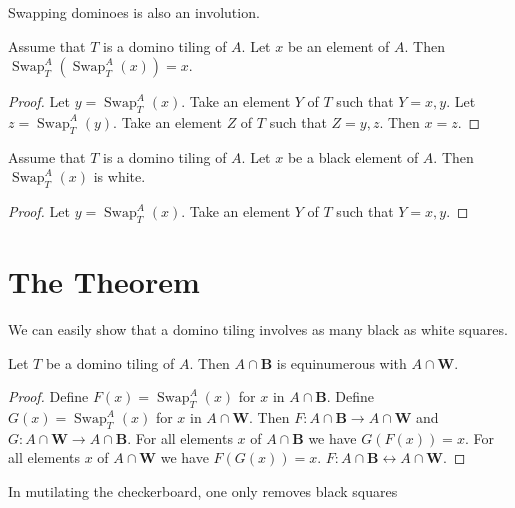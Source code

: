 \documentclass{article}
\newcommand{\Black}{\mathbf{B}}
\newcommand{\White}{\mathbf{W}}
\newcommand{\Sw}[3]{\operatorname{Swap}_{#1}^{#2}(#3)}
\begin{document}
Swapping dominoes is also an involution.

\begin{forthel}
    \begin{lemma}
        Assume that $T$ is a domino tiling of $A$. Let $x$ be an element of $A$.
        Then $\Sw{T}{A}{\Sw{T}{A}{x}} = x$.
    \end{lemma}
    \begin{proof}
        Let $y = \Sw{T}{A}{x}$.
        Take an element $Y$ of $T$ such that $Y = {x,y}$.
        Let $z = \Sw{T}{A}{y}$.
        Take an element $Z$ of $T$ such that $Z = {y,z}$.
        Then $x = z$.
    \end{proof}

    \begin{lemma}
        Assume that $T$ is a domino tiling of $A$.
        Let $x$ be a black element of $A$.
        Then $\Sw{T}{A}{x}$ is white.
    \end{lemma}
    \begin{proof}
        Let $y = \Sw{T}{A}{x}$.
        Take an element $Y$ of $T$ such that $Y = {x,y}$.
    \end{proof}
\end{forthel}

\section{The Theorem}

\noindent We can easily show that a domino tiling involves as many black as white squares.

\begin{forthel}
    \begin{lemma}
        Let $T$ be a domino tiling of $A$. Then $A \cap \Black$ is
        equinumerous with $A \cap \White$.
    \end{lemma}
    \begin{proof}
        Define $F(x) = \Sw{T}{A}{x}$ for $x$ in $A \cap \Black$.
        Define $G(x) = \Sw{T}{A}{x}$ for $x$ in $A \cap \White$.
        Then $F: A \cap \Black \to A \cap \White$ and
        $G: A \cap \White \to A \cap \Black$.
        For all elements $x$ of $A \cap \Black$ we have $G(F(x))=x$.
        For all elements $x$ of $A \cap \White$ we have $F(G(x))=x$.
        $F : A \cap \Black \leftrightarrow A \cap \White$.
    \end{proof}
\end{forthel}

\noindent In mutilating the checkerboard, one only removes black squares
\end{document}
